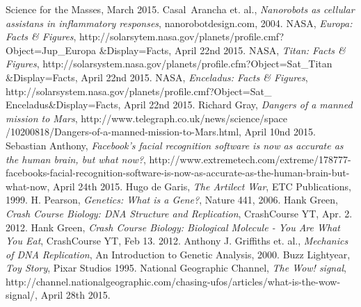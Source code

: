\begin{thebibliography}{99}
		Science for the Masses,
		March 2015.
		Casal\, Arancha et. al.,
		\emph{Nanorobots as cellular assistans in inflammatory responses},
		nanorobotdesign.com,
		2004.
		NASA,
		\emph{Europa: Facts \& Figures},
		http://solarsytem.nasa.gov/planets/profile.cmf?Object=Jup\_Europa \&Display=Facts,
		April 22nd 2015.
		NASA,
		\emph{Titan: Facts \& Figures},
		http://solarsystem.nasa.gov/planets/profile.cfm?Object=Sat\_Titan \&Display=Facts,
		April 22nd 2015.
		NASA,
		\emph{Enceladus: Facts \& Figures},
		http://solarsystem.nasa.gov/planets/profile.cmf?Object=Sat\_ Enceladus\&Display=Facts,
		April 22nd 2015.
		Richard Gray,
		\emph{Dangers of a manned mission to Mars},
		http://www.telegraph.co.uk/news/science/space /10200818/Dangers-of-a-manned-mission-to-Mars.html,
		April 10nd 2015.
		Sebastian Anthony,
		\emph{Facebook’s facial recognition software is now as accurate as the human brain, but what now?},
		http://www.extremetech.com/extreme/178777-facebooks-facial-recognition-software-is-now-as-accurate-as-the-human-brain-but-what-now,
		April 24th 2015.
		Hugo de Garis,
		\emph{The Artilect War},
		ETC Publications,
		1999.
		H. Pearson,
		\emph{Genetics: What is a Gene?},
		Nature 441,
		2006.
		Hank Green,
		\emph{Crash Course Biology: DNA Structure and Replication},
		CrashCourse YT,
		Apr. 2. 2012.
		Hank Green,
		\emph{Crash Course Biology: Biological Molecule - You Are What You Eat},
		CrashCourse YT,
		Feb 13. 2012.
		Anthony J. Griffiths et. al.,
		\emph{Mechanics of DNA Replication},
		An Introduction to Genetic Analysis,
		2000.
		Buzz Lightyear,
		\emph{Toy Story},
		Pixar Studios 1995.
		National Geographic Channel,
		\emph{The Wow! signal},
		http://channel.nationalgeographic.com/chasing-ufos/articles/what-is-the-wow-signal/,
		April 28th 2015.
\end{thebibliography}